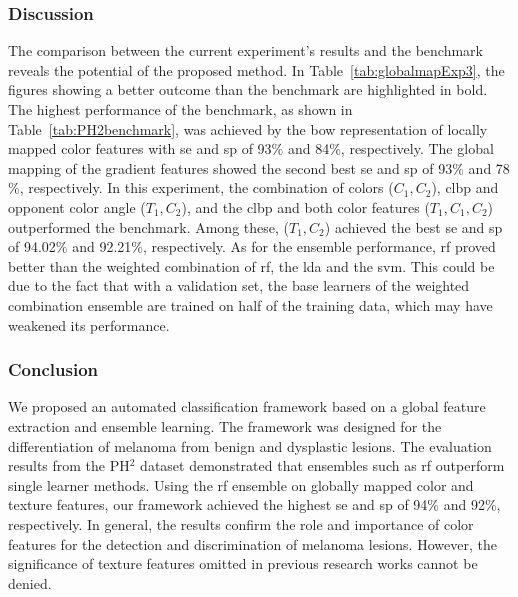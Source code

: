 \subsubsection{Discussion}
The comparison between the current experiment's results and the benchmark reveals the potential of the proposed method. 
In Table~\ref{tab:globalmapExp3}, the figures showing a better outcome than the benchmark are highlighted in bold. 
The highest performance of the benchmark, as shown in Table~\ref{tab:PH2benchmark}, was achieved by the \ac{bow} representation of locally mapped color features with \ac{se} and \ac{sp} of 93$\%$ and 84$\%$, respectively.
The global mapping of the gradient features showed the second best \ac{se} and \ac{sp} of 93$\%$ and 78$\%$, respectively.
In this experiment, the combination of colors ($C_{1},C_{2}$), \ac{clbp} and opponent color angle ($T_{1},C_{2}$), and the \ac{clbp} and both color features ($T_{1},C_{1},C_{2}$) outperformed the benchmark.
Among these, ($T_{1},C_{2}$) achieved the best \ac{se} and \ac{sp} of 94.02$\%$ and 92.21$\%$, respectively.
As for the ensemble performance, \ac{rf} proved better than the weighted combination of \ac{rf}, the \ac{lda} and the \ac{svm}. 
This could be due to the fact that with a validation set, the base learners of the weighted combination ensemble are trained on half of the training data, which may have weakened its performance.

\subsubsection{Conclusion}
We proposed an automated classification framework based on a global feature extraction and ensemble learning. 
The framework was designed for the differentiation of melanoma from benign and dysplastic lesions.
The evaluation results from the PH$^{2}$ dataset demonstrated that ensembles such as \ac{rf} outperform single learner methods.
Using the \ac{rf} ensemble on globally mapped color and texture features, our framework achieved the highest \ac{se} and \ac{sp} of 94$\%$ and 92$\%$, respectively.
In general, the results confirm the role and importance of color features for the detection and discrimination of melanoma lesions.
However, the significance of texture features omitted in previous research works cannot be denied. 


